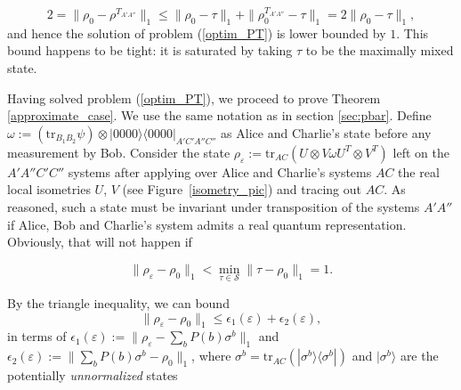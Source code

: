 \documentclass[onecolumn,prx,amsmath,amssymb,12pt]{revtex4-2}
\def\be{\begin{equation}}
\def\ee{\end{equation}}
\def\bra#1{\langle#1|} \def\ket#1{|#1\rangle}
\def\ketbra#1#2{\ket{#1}\!\bra{#2}}
\def\tr{\mbox{tr}}
\def\norm#1{\| #1 \| }
\begin{document}
\begin{appendix}
\be
2=\|\rho_0-\rho^{T_{A'A''}}\|_1\leq \|\rho_0-\tau\|_1+\|\rho^{T_{A'A''}}_0-\tau\|_1=2\|\rho_0-\tau\|_1,
\ee
\noindent and hence the solution of problem (\ref{optim_PT}) is lower bounded by $1$. This bound happens to be tight: it is saturated by taking $\tau$ to be the maximally mixed state.

Having solved problem (\ref{optim_PT}), we proceed to prove Theorem \ref{approximate_case}. We use the same notation as in section \ref{sec:pbar}. Define $\omega:=(\tr_{B_1B_2}\psi)\otimes\ketbra{0000}{0000}_{A'C'A''C''}$ as Alice and Charlie's state before any measurement by Bob. Consider the state $\rho_\varepsilon:=\tr_{{AC}}(U\otimes V \omega U^T\otimes V^T)$ left on the $A'A''C'C''$ systems after applying over Alice and Charlie's systems ${AC}$ the real local isometries $U$, $V$ (see Figure~\ref{isometry_pic}) and tracing out ${AC}$.  As reasoned, such a state must be invariant under transposition of the systems $A'A''$ if Alice, Bob and Charlie's system admits a real quantum representation. Obviously, that will not happen if

\be
\norm{\rho_{\varepsilon}-\rho_0}_1 < \min_{\tau \in \mathcal{S}}\norm{\tau-\rho_0}_1=1.
\label{trace_norm_arg}
\ee

By the triangle inequality, we can bound
\begin{equation}\label{eq:normbnd}
\norm{\rho_{\varepsilon}-\rho_0}_1\leq \epsilon_1(\varepsilon)+\epsilon_2(\varepsilon),
\end{equation}
in terms of $\epsilon_1(\varepsilon) :=\norm{\rho_{\varepsilon}-\sum_b P(b) \sigma^b}_1$ and $\epsilon_2(\varepsilon) :=\norm{\sum_b P(b) \sigma^b-\rho_0}_1$, where $\sigma^b= \tr_{{AC}}(\ketbra{\sigma^b}{\sigma^b})$ and $\ket{\sigma^b}$ are the potentially {\em unnormalized} states


\end{appendix}
\end{document}
